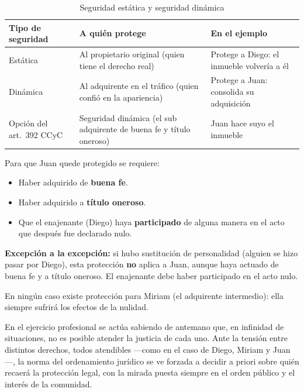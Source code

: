 \documentclass[12pt,oneside]{book}
\begin{document}
\begin{table}[H]
\centering
\caption{Seguridad estática y seguridad dinámica}
\small
\begin{tabularx}{\textwidth}{
    >{\raggedright\arraybackslash}p{}
    >{\raggedright\arraybackslash}X
    >{\raggedright\arraybackslash}X
}
\toprule
\textbf{Tipo de seguridad} & \textbf{A quién protege} & \textbf{En el ejemplo} \\
\midrule
Estática & Al propietario original (quien tiene el derecho real) & Protege a Diego: el inmueble volvería a él \\
Dinámica & Al adquirente en el tráfico (quien confió en la apariencia) & Protege a Juan: consolida su adquisición \\
Opción del art.~392 CCyC & Seguridad dinámica (el sub adquirente de buena fe y título oneroso) & Juan hace suyo el inmueble \\
\bottomrule
\end{tabularx}
\end{table}

Para que Juan quede protegido se requiere:

\begin{itemize}
    \item Haber adquirido de \textbf{buena fe}.
    \item Haber adquirido a \textbf{título oneroso}.
    \item Que el enajenante (Diego) haya \textbf{participado} de alguna manera en el acto que después fue declarado nulo.
\end{itemize}

\begin{important}
\textbf{Excepción a la excepción:} si hubo sustitución de personalidad (alguien se hizo pasar por Diego), esta protección \textbf{no} aplica a Juan, aunque haya actuado de buena fe y a título oneroso. El enajenante debe haber participado en el acto nulo.
\end{important}

En ningún caso existe protección para Miriam (el adquirente intermedio): ella siempre sufrirá los efectos de la nulidad.

\begin{note}
En el ejercicio profesional se actúa sabiendo de antemano que, en infinidad de situaciones, no es posible atender la justicia de cada uno. Ante la tensión entre distintos derechos, todos atendibles ---como en el caso de Diego, Miriam y Juan---, la norma del ordenamiento jurídico se ve forzada a decidir a priori sobre quién recaerá la protección legal, con la mirada puesta siempre en el orden público y el interés de la comunidad.
\end{note}
\end{document}
